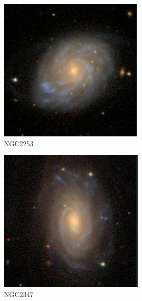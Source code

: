 \documentclass[9pt]{revtex4-1}
\begin{document}
\begin{figure}
\includegraphics[scale=0.3]{NGC2253.png}
\caption{NGC2253}
\end{figure}
\begin{figure}
\includegraphics[scale=0.3]{NGC2347.png}
\caption{NGC2347}
\end{figure}

\clearpage
\end{document}
